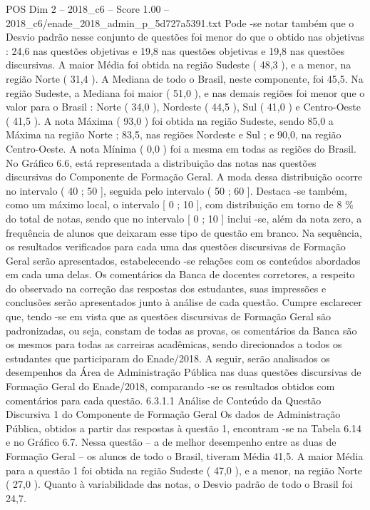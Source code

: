 \begin{textsample}{POS Dim 2 – 2018\_c6 – Score 1.00 – 2018\_c6/enade\_2018\_admin\_p\_5d727a5391.txt}
Pode -se notar também que o Desvio padrão nesse conjunto de questões foi menor do que o obtido nas objetivas : 24,6 nas questões objetivas e 19,8 nas questões objetivas e 19,8 nas questões discursivas.
A maior Média foi obtida na região Sudeste ( 48,3 ), e a menor, na região Norte ( 31,4 ).
A Mediana de todo o Brasil, neste componente, foi 45,5.
Na região Sudeste, a Mediana foi maior ( 51,0 ), e nas demais regiões foi menor que o valor para o Brasil : Norte ( 34,0 ), Nordeste ( 44,5 ), Sul ( 41,0 ) e Centro-Oeste ( 41,5 ).
A nota Máxima ( 93,0 ) foi obtida na região Sudeste, sendo 85,0 a Máxima na região Norte ; 83,5, nas regiões Nordeste e Sul ; e 90,0, na região Centro-Oeste.
A nota Mínima ( 0,0 ) foi a mesma em todas as regiões do Brasil.
No Gráfico 6.6, está representada a distribuição das notas nas questões discursivas do Componente de Formação Geral.
A moda dessa distribuição ocorre no intervalo ( 40 ; 50 ], seguida pelo intervalo ( 50 ; 60 ].
Destaca -se também, como um máximo local, o intervalo [ 0 ; 10 ], com distribuição em torno de 8 \% do total de notas, sendo que no intervalo [ 0 ; 10 ] inclui -se, além da nota zero, a frequência de alunos que deixaram esse tipo de questão em branco.
Na sequência, os resultados verificados para cada uma das questões discursivas de Formação Geral serão apresentados, estabelecendo -se relações com os conteúdos abordados em cada uma delas.
Os comentários da Banca de docentes corretores, a respeito do observado na correção das respostas dos estudantes, suas impressões e conclusões serão apresentados junto à análise de cada questão.
Cumpre esclarecer que, tendo -se em vista que as questões discursivas de Formação Geral são padronizadas, ou seja, constam de todas as provas, os comentários da Banca são os mesmos para todas as carreiras acadêmicas, sendo direcionados a todos os estudantes que participaram do Enade/2018.
A seguir, serão analisados os desempenhos da Área de Administração Pública nas duas questões discursivas de Formação Geral do Enade/2018, comparando -se os resultados obtidos com comentários para cada questão. 6.3.1.1 Análise de Conteúdo da Questão Discursiva 1 do Componente de Formação Geral Os dados de Administração Pública, obtidos a partir das respostas à questão 1, encontram -se na Tabela 6.14 e no Gráfico 6.7.
Nessa questão – a de melhor desempenho entre as duas de Formação Geral – os alunos de todo o Brasil, tiveram Média 41,5.
A maior Média para a questão 1 foi obtida na região Sudeste ( 47,0 ), e a menor, na região Norte ( 27,0 ).
Quanto à variabilidade das notas, o Desvio padrão de todo o Brasil foi 24,7.

\end{textsample}
